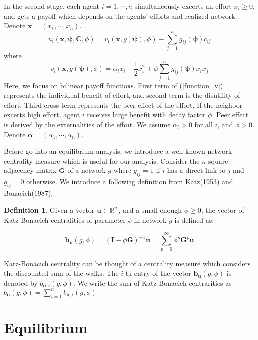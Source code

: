 \documentclass[12pt]{article}
\theoremstyle{definition}
\newtheorem{definition}{Definition}
\begin{document}
In the second stage, each agent $i = 1, \cdots, n$ simultaneously excerts an effort $x_i \ge 0$, and gets a payoff which depends on the agents' efforts and realized network.
Denote $\bm{x} = (x_1, \cdots, x_n)$.
\[ u_i(\bm{x}, \bm{\psi}, \bm{C}, \phi) = v_i(\bm{x}, g(\bm{\psi}), \phi) - \sum_{j=1}^n g_{ij}(\bm{\psi}) c_{ij} \]
where
\begin{equation}
\label{function_v}
	v_i(\bm{x}, g(\bm{\psi}), \phi) = \alpha_i x_i - \frac{1}{2} x_i^2 + \phi \sum_{j=1}^n g_{ij}(\bm{\psi}) x_i x_j
\end{equation}
Here, we focus on bilinear payoff functions.
First term of (\ref{function_v}) represents the individual benefit of effort, and second term is the disutility of effort.
Third cross term represents the peer effect of the effort.
If the neighbor excerts high effort, agent $i$ receives large benefit with decay factor $\phi$.
Peer effect is derived by the externalities of the effort.
We assume $\alpha_i > 0$ for all $i$, and $\phi > 0$.
Denote $\bm{\alpha} = (\alpha_1, \cdots, \alpha_n)$.

Before go into an equilibrium analysis, we introduce a well-known network centrality measure which is useful for our analysis.
Consider the $n$-square adjacency matrix $\bm{G}$ of a network $g$ where $g_{ij} = 1$ if $i$ has a direct link to $j$ and $g_{ij} = 0$ otherwise.
We introduce a following definition from Katz(1953) and Bonacich(1987).

\begin{definition}
Given a vector $\bm{u} \in \mathbb{R}_+^n$, and a small enough $\phi \ge 0$, the vector of Katz-Bonacich centralities of parameter $\phi$ in network $g$ is defined as:

\[ \bm{b}_{\bm{u}}(g, \phi) = {(\bm{I} - \phi \bm{G})}^{-1} \bm{u} = \sum_{p=0}^{\infty} \phi^p \bm{G}^p \bm{u} \]

\end{definition}

Katz-Bonacich centrality can be thought of a centrality measure which considers the discounted sum of the walks.
The $i$-th entry of the vector $\bm{b}_{\bm{u}}(g, \phi)$ is denoted by $b_{\bm{u}, i}(g, \phi)$.
We write the sum of Katz-Bonacich centrarities as $b_{\bm{u}}(g, \phi) = \sum_{i=1}^n b_{\bm{u}, i}(g, \phi)$


\section{Equilibrium}
\end{document}
